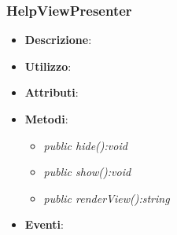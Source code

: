 \subsubsection{HelpViewPresenter}
\begin{itemize}
\item \textbf{Descrizione}: 
\item \textbf{Utilizzo}:
\item \textbf{Attributi}:
\item \textbf{Metodi}:
	\begin{itemize}
	\item \textit{public hide():void}\\
	
	\item \textit{public show():void}\\

	\item \textit{public renderView():string}\\
	
	\end{itemize}
\item \textbf{Eventi}:
\end{itemize}